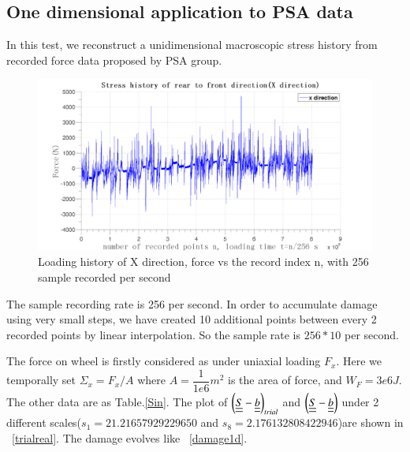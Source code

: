 \documentclass[3p,times,number,review]{elsarticle}
\newcommand{\figref}[1]{\figurename~\ref{#1}}
\begin{document}
\subsection{One dimensional application to PSA data}
In this test, we reconstruct a unidimensional macroscopic stress history from recorded force data proposed by PSA group. 
\begin{figure}[!h]
	\centering
	\includegraphics[width=\textwidth]{figures//x.png} 
	\caption{Loading history of X direction, force vs the record index n, with 256 sample recorded per second}
	\label{x}
\end{figure}

The sample recording rate is 256 per second. In order to accumulate damage using very small steps, we have created 10 additional points between every 2 recorded points by linear interpolation. So the sample rate is $256*10$ per second. 

The force on wheel is firstly considered as under uniaxial loading $F_x$. Here we temporally set $\Sigma_x=F_x/A$ where $A=\dfrac{1}{1e6} m^2$ is the area of force, and $W_F=3e6 J$. The other data are as Table.\ref{Sin}. The plot of $\left( \uline{\uline{S}}-\uline{\uline{b}}\right)_{trial}$ and $\left( \uline{\uline{S}}-\uline{\uline{b}}\right)$ under 2 different scales($s_1=21.21657929229650$ and $s_8=2.176132808422946$)are shown in \figref{trialreal}. The damage evolves like \figref{damage1d}.
\end{document}
